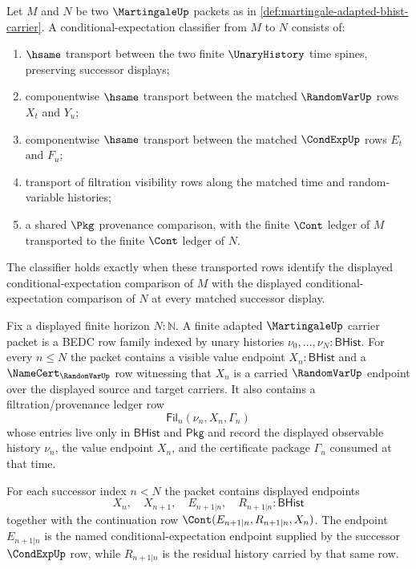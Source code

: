 \begin{definition}
\label{def:martingale-conditional-expectation-classifier}
Let $M$ and $N$ be two $\MartingaleUp$ packets as in \autoref{def:martingale-adapted-bhist-carrier}. A conditional-expectation classifier from $M$ to $N$ consists of:
\begin{enumerate}
\item $\hsame$ transport between the two finite $\UnaryHistory$ time spines, preserving successor displays;
\item componentwise $\hsame$ transport between the matched $\RandomVarUp$ rows $X_t$ and $Y_u$;
\item componentwise $\hsame$ transport between the matched $\CondExpUp$ rows $E_t$ and $F_u$;
\item transport of filtration visibility rows along the matched time and random-variable histories;
\item a shared $\Pkg$ provenance comparison, with the finite $\Cont$ ledger of $M$ transported to the finite $\Cont$ ledger of $N$.
\end{enumerate}
The classifier holds exactly when these transported rows identify the displayed conditional-expectation comparison of $M$ with the displayed conditional-expectation comparison of $N$ at every matched successor display.
\end{definition}

\begin{definition}
\label{def:martingale-adapted-bhist-stream-carrier}
Fix a displayed finite horizon $N:\mathbb N$. A finite adapted
$\MartingaleUp$ carrier packet is a BEDC row family indexed by unary histories
$\nu_0,\ldots,\nu_N:\mathsf{BHist}$. For every $n\leq N$ the packet contains
a visible value endpoint $X_n:\mathsf{BHist}$ and a
$\NameCert_{\RandomVarUp}$ row witnessing that $X_n$ is a carried
$\RandomVarUp$ endpoint over the displayed source and target carriers. It
also contains a filtration/provenance ledger row
$$
\mathsf{Fil}_n(\nu_n,X_n,\Gamma_n)
$$
whose entries live only in $\mathsf{BHist}$ and $\mathsf{Pkg}$ and record the
displayed observable history $\nu_n$, the value endpoint $X_n$, and the
certificate package $\Gamma_n$ consumed at that time.

For each successor index $n<N$ the packet contains displayed endpoints
$$
X_n,\quad X_{n+1},\quad E_{n+1|n},\quad R_{n+1|n}:\mathsf{BHist}
$$
together with the continuation row
$\Cont(E_{n+1|n},R_{n+1|n},X_n)$. The endpoint $E_{n+1|n}$ is the named
conditional-expectation endpoint supplied by the successor
$\CondExpUp$ row, while $R_{n+1|n}$ is the residual history carried by that
same row.
\end{definition}

